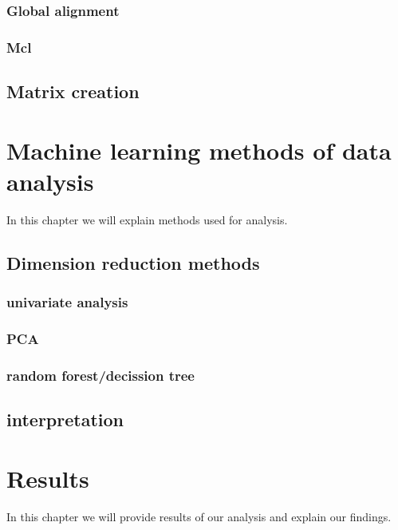 \subsection{Global alignment}
\subsection{Mcl}
\section{Matrix creation}

\chapter{Machine learning methods of data analysis}
In this chapter we will explain methods used for analysis.

\section{Dimension reduction methods}
\subsection{univariate analysis}
\subsection{PCA}
\subsection{random forest/decission tree}
\section{interpretation}

\chapter{Results}
In this chapter we will provide results of our analysis and explain our findings.
